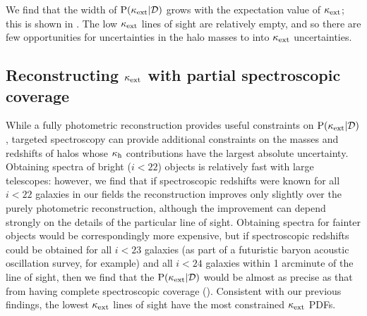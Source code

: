 \documentclass[useAMS,usenatbib,a4paper]{mn2e}
\begin{document}


We find that the width of ${\rm P}(\kappa_{\rm ext}|{\mathcal{D}})$ grows with the expectation
value of $\kappa_{\rm ext}$; this is shown in . The low $\kappa_{\rm ext}$
lines of sight are relatively empty, and so there are few opportunities for
uncertainties in the halo masses to \propogate into $\kappa_{\rm ext}$ uncertainties.

%



\subsection{Reconstructing $\kappa_{\rm ext}$ with partial spectroscopic coverage}
\label{sec:obsMstar+z:targetedspec}

While a fully photometric reconstruction provides useful constraints on
${\rm P}(\kappa_{\rm ext}|{\mathcal{D}})$, targeted spectroscopy can provide additional constraints
on the masses and redshifts of halos whose $\kappa_{\rm h}$ contributions have the
largest absolute uncertainty. Obtaining spectra of bright ($i<22$) objects is
relatively fast with large telescopes: however, we find that if spectroscopic
redshifts were known for all $i<22$ galaxies in our fields the reconstruction
improves only slightly over the purely photometric reconstruction,  although
the improvement can depend strongly on the details of the particular line of
sight. Obtaining spectra for fainter objects would be correspondingly more
expensive, but if spectroscopic redshifts could be obtained for all $i<23$
galaxies (as part of a futuristic baryon acoustic oscillation survey, for
example) and all $i<24$ galaxies within 1 arcminute of the line of sight, then
we find that the ${\rm P}(\kappa_{\rm ext}|{\mathcal{D}})$ would be almost as precise as that from
having complete spectroscopic coverage ().
Consistent with our previous findings, the lowest $\kappa_{\rm ext}$ lines of
sight have the most constrained $\kappa_{\rm ext}$ PDFs.
\end{document}
